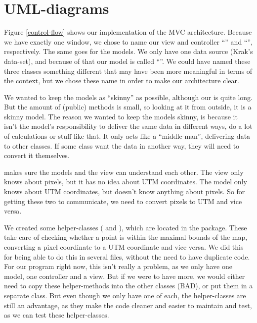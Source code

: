 \chapter{UML-diagrams}
\label{UML}

Figure \ref{control-flow} shows our implementation of the MVC architecture.
Because we have exactly one window, we chose to name our view and controller ``'' and 
``'', respectively. The same goes for the models. We only have one data 
source (Krak's data-set), and because of that our model is called ``''. We could 
have named these three classes something different that may have been more meaningful 
in terms of the  context, but we chose these name in order to make 
our architecture clear.

We wanted to keep the models as ``skinny'' as possible, although our  is quite long. 
But the amount of (public) methods is small, so looking at it from outside, it is a skinny model. 
The reason we wanted to keep the models skinny, is because it isn't the model's responsibility to 
deliver the same data in different ways, do a lot of calculations or stuff like that. It only acts like a 
``middle-man'', delivering data to other classes. If some class want the data in another way, they 
will need to convert it themselves.

 makes sure the models and the view can understand each other. The view 
only knows about pixels, but it has no idea about UTM coordinates. The model only knows 
about UTM coordinates, but doesn't know anything about pixels. So for getting these two to 
communicate, we need to convert pixels to UTM and vice versa.

We created some helper-classes ( and ), 
which are located in the  package. These take care of checking whether a point 
is within the maximal bounds of the map, converting a pixel coordinate to a UTM coordinate 
and vice versa. We did this for being able to do this in several files, without the need to have 
duplicate code. For our program right now, this isn't really a problem, as we only have one 
model, one controller and a view. But if we were to have more, we would either need to copy 
these helper-methods into the other classes (BAD), or put them in a separate class. But even 
though we only have one of each, the helper-classes are still an advantage, as
they make the code cleaner and easier to maintain and test, as we can test these helper-classes.


